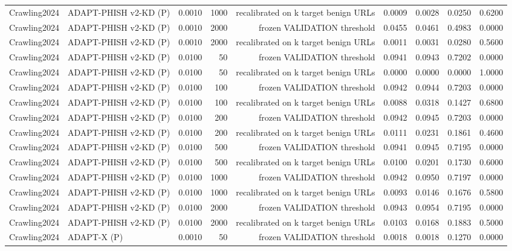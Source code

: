 \begin{table}[t]
\begin{tabular}{llrrrrrrr}
Crawling2024 & ADAPT-PHISH v2-KD (P) & 0.0010 & 1000 & recalibrated on k target benign URLs & 0.0009 & 0.0028 & 0.0250 & 0.6200 \\
Crawling2024 & ADAPT-PHISH v2-KD (P) & 0.0010 & 2000 & frozen VALIDATION threshold & 0.0455 & 0.0461 & 0.4983 & 0.0000 \\
Crawling2024 & ADAPT-PHISH v2-KD (P) & 0.0010 & 2000 & recalibrated on k target benign URLs & 0.0011 & 0.0031 & 0.0280 & 0.5600 \\
Crawling2024 & ADAPT-PHISH v2-KD (P) & 0.0100 & 50 & frozen VALIDATION threshold & 0.0941 & 0.0943 & 0.7202 & 0.0000 \\
Crawling2024 & ADAPT-PHISH v2-KD (P) & 0.0100 & 50 & recalibrated on k target benign URLs & 0.0000 & 0.0000 & 0.0000 & 1.0000 \\
Crawling2024 & ADAPT-PHISH v2-KD (P) & 0.0100 & 100 & frozen VALIDATION threshold & 0.0942 & 0.0944 & 0.7203 & 0.0000 \\
Crawling2024 & ADAPT-PHISH v2-KD (P) & 0.0100 & 100 & recalibrated on k target benign URLs & 0.0088 & 0.0318 & 0.1427 & 0.6800 \\
Crawling2024 & ADAPT-PHISH v2-KD (P) & 0.0100 & 200 & frozen VALIDATION threshold & 0.0942 & 0.0945 & 0.7203 & 0.0000 \\
Crawling2024 & ADAPT-PHISH v2-KD (P) & 0.0100 & 200 & recalibrated on k target benign URLs & 0.0111 & 0.0231 & 0.1861 & 0.4600 \\
Crawling2024 & ADAPT-PHISH v2-KD (P) & 0.0100 & 500 & frozen VALIDATION threshold & 0.0941 & 0.0945 & 0.7195 & 0.0000 \\
Crawling2024 & ADAPT-PHISH v2-KD (P) & 0.0100 & 500 & recalibrated on k target benign URLs & 0.0100 & 0.0201 & 0.1730 & 0.6000 \\
Crawling2024 & ADAPT-PHISH v2-KD (P) & 0.0100 & 1000 & frozen VALIDATION threshold & 0.0942 & 0.0950 & 0.7197 & 0.0000 \\
Crawling2024 & ADAPT-PHISH v2-KD (P) & 0.0100 & 1000 & recalibrated on k target benign URLs & 0.0093 & 0.0146 & 0.1676 & 0.5800 \\
Crawling2024 & ADAPT-PHISH v2-KD (P) & 0.0100 & 2000 & frozen VALIDATION threshold & 0.0943 & 0.0954 & 0.7195 & 0.0000 \\
Crawling2024 & ADAPT-PHISH v2-KD (P) & 0.0100 & 2000 & recalibrated on k target benign URLs & 0.0103 & 0.0168 & 0.1883 & 0.5000 \\
Crawling2024 & ADAPT-X (P) & 0.0010 & 50 & frozen VALIDATION threshold & 0.0018 & 0.0018 & 0.1270 & 0.0000 \\

\end{tabular}
\end{table}
